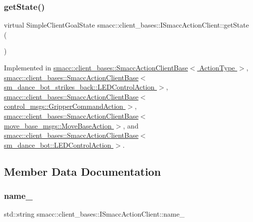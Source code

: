 \subsubsection{\texorpdfstring{get\+State()}{getState()}}
{\footnotesize\ttfamily virtual Simple\+Client\+Goal\+State smacc\+::client\+\_\+bases\+::\+I\+Smacc\+Action\+Client\+::get\+State (\begin{DoxyParamCaption}{ }\end{DoxyParamCaption})\hspace{0.3cm}{\ttfamily [pure virtual]}}



Implemented in \hyperlink{classsmacc_1_1client__bases_1_1SmaccActionClientBase_a97192acd7bb7cac5de0191e700ab72ee}{smacc\+::client\+\_\+bases\+::\+Smacc\+Action\+Client\+Base$<$ Action\+Type $>$}, \hyperlink{classsmacc_1_1client__bases_1_1SmaccActionClientBase_a97192acd7bb7cac5de0191e700ab72ee}{smacc\+::client\+\_\+bases\+::\+Smacc\+Action\+Client\+Base$<$ sm\+\_\+dance\+\_\+bot\+\_\+strikes\+\_\+back\+::\+L\+E\+D\+Control\+Action $>$}, \hyperlink{classsmacc_1_1client__bases_1_1SmaccActionClientBase_a97192acd7bb7cac5de0191e700ab72ee}{smacc\+::client\+\_\+bases\+::\+Smacc\+Action\+Client\+Base$<$ control\+\_\+msgs\+::\+Gripper\+Command\+Action $>$}, \hyperlink{classsmacc_1_1client__bases_1_1SmaccActionClientBase_a97192acd7bb7cac5de0191e700ab72ee}{smacc\+::client\+\_\+bases\+::\+Smacc\+Action\+Client\+Base$<$ move\+\_\+base\+\_\+msgs\+::\+Move\+Base\+Action $>$}, and \hyperlink{classsmacc_1_1client__bases_1_1SmaccActionClientBase_a97192acd7bb7cac5de0191e700ab72ee}{smacc\+::client\+\_\+bases\+::\+Smacc\+Action\+Client\+Base$<$ sm\+\_\+dance\+\_\+bot\+::\+L\+E\+D\+Control\+Action $>$}.



\subsection{Member Data Documentation}
\mbox{\label{classsmacc_1_1client__bases_1_1ISmaccActionClient_a74c660a4c111a3b8858b9b7b1cedc866}} 
\subsubsection{\texorpdfstring{name\+\_\+}{name\_}}
{\footnotesize\ttfamily std\+::string smacc\+::client\+\_\+bases\+::\+I\+Smacc\+Action\+Client\+::name\+\_\+\hspace{0.3cm}{\ttfamily [protected]}}



